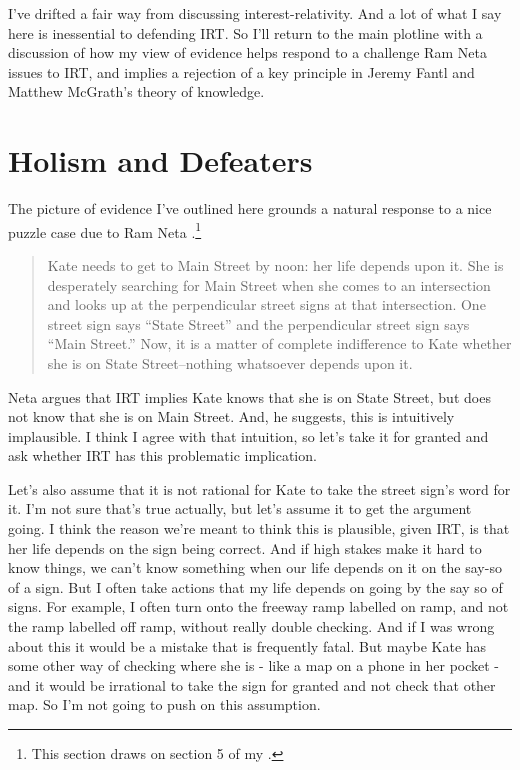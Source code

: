 \documentclass[
  11pt,
]{book}
\begin{document}
I've drifted a fair way from discussing interest-relativity. And a lot of what I say here is inessential to defending IRT. So I'll return to the main plotline with a discussion of how my view of evidence helps respond to a challenge Ram Neta issues to IRT, and implies a rejection of a key principle in Jeremy Fantl and Matthew McGrath's theory of knowledge.

\hypertarget{neta}{%
\section{Holism and Defeaters}\label{neta}}

The picture of evidence I've outlined here grounds a natural response to a nice puzzle case due to Ram Neta \citeyearpar{Neta2007}.\footnote{This section draws on section 5 of my \citeyearpar{Weatherson2011-WEADIR}.}

\begin{quote}
Kate needs to get to Main Street by noon: her life depends upon it. She is desperately searching for Main Street when she comes to an intersection and looks up at the perpendicular street signs at that intersection. One street sign says ``State Street'' and the perpendicular street sign says ``Main Street.'' Now, it is a matter of complete indifference to Kate whether she is on State Street--nothing whatsoever depends upon it. \citep[ 182]{Neta2007}
\end{quote}

Neta argues that IRT implies Kate knows that she is on State Street, but does not know that she is on Main Street. And, he suggests, this is intuitively implausible. I think I agree with that intuition, so let's take it for granted and ask whether IRT has this problematic implication.

Let's also assume that it is not rational for Kate to take the street sign's word for it. I'm not sure that's true actually, but let's assume it to get the argument going. I think the reason we're meant to think this is plausible, given IRT, is that her life depends on the sign being correct. And if high stakes make it hard to know things, we can't know something when our life depends on it on the say-so of a sign. But I often take actions that my life depends on going by the say so of signs. For example, I often turn onto the freeway ramp labelled on ramp, and not the ramp labelled off ramp, without really double checking. And if I was wrong about this it would be a mistake that is frequently fatal. But maybe Kate has some other way of checking where she is - like a map on a phone in her pocket - and it would be irrational to take the sign for granted and not check that other map. So I'm not going to push on this assumption.
\end{document}
